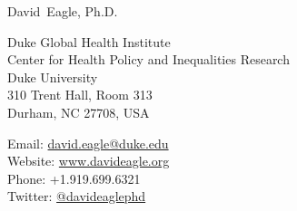 \documentclass[11pt, letter]{article}
\makeatletter
\newcommand{\FirstName}{David}
\newcommand{\LastName}{Eagle}
\newcommand{\Degree}{Ph.D.}
\newcommand{\MyName}{\FirstName\ \LastName, \Degree}
\newcommand{\MyRole}{Assistant Research Professor}
\newcommand{\Email}{david.eagle@duke.edu}
\newcommand{\Website}{www.davideagle.org}
\newcommand{\Twitter}{@davideaglephd}
\newcommand{\Phone}{+1.919.699.6321}
\newcommand{\Affiliation}{
Duke Global Health Institute\\
Center for Health Policy and Inequalities Research\\
Duke University
}
\newcommand{\Address}{
    310 Trent Hall, Room 313\\
    Durham, NC 27708, USA
}
\makeatother
\begin{document}
\thispagestyle{empty}

\begin{center}
    {\fontsize{24pt}{0}\selectfont \MyName}
    \\[0.3cm]
\end{center}

  \noindent
\begin{minipage}{.5\textwidth}
\Affiliation\\
\Address\\
\end{minipage}
\begin{minipage}{.5\textwidth}
\flushright
Email: \href{mailto:\Email}{\texttt\small{\Email}}\\
Website: \small{\url{\Website}}\\
Phone: \Phone\\
Twitter: \href{https://twitter.com/davideaglephd}{\texttt\small{\Twitter}}\\
\end{minipage}










%
\end{document}
